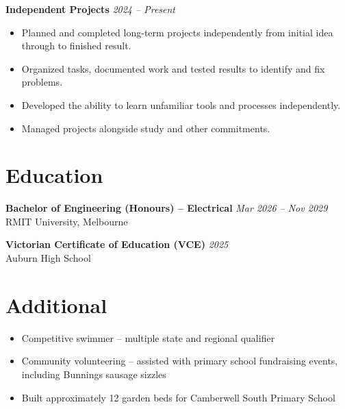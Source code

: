 \documentclass[11pt,a4paper]{article}
\begin{document}
\noindent\textbf{Independent Projects} \hfill \textit{2024 -- Present} \\
\begin{itemize}[leftmargin=*, noitemsep, topsep=2pt]
\item Planned and completed long-term projects independently from initial idea through to finished result.
\item Organized tasks, documented work and tested results to identify and fix problems.
\item Developed the ability to learn unfamiliar tools and processes independently.
\item Managed projects alongside study and other commitments.
\end{itemize}

\section*{Education}

\noindent\textbf{Bachelor of Engineering (Honours) -- Electrical} \hfill \textit{Mar 2026 -- Nov 2029} \\
RMIT University, Melbourne

\noindent\textbf{Victorian Certificate of Education (VCE)} \hfill \textit{2025} \\
Auburn High School

\section*{Additional}
\begin{itemize}[leftmargin=*, noitemsep, topsep=2pt]
\item Competitive swimmer -- multiple state and regional qualifier
\item Community volunteering -- assisted with primary school fundraising events, including Bunnings sausage sizzles
\item Built approximately 12 garden beds for Camberwell South Primary School
\end{itemize}
\end{document}
